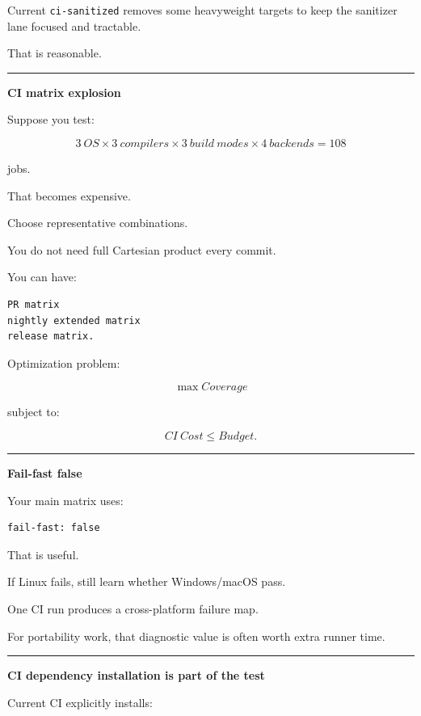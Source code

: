 Current \texttt{ci-sanitized} removes some heavyweight targets to keep the sanitizer lane focused and tractable.

That is reasonable.

\begin{center}\rule{0.5\linewidth}{0.5pt}\end{center}

\textbf{CI matrix explosion}

Suppose you test:

\[
3\ OS
\times
3\ compilers
\times
3\ build\ modes
\times
4\ backends
=
108
\]

jobs.

That becomes expensive.

Choose representative combinations.

You do not need full Cartesian product every commit.

You can have:

\begin{verbatim}
PR matrix
nightly extended matrix
release matrix.
\end{verbatim}

Optimization problem:

\[
\max Coverage
\]

subject to:

\[
CI\ Cost\le Budget.
\]

\begin{center}\rule{0.5\linewidth}{0.5pt}\end{center}

\textbf{Fail-fast false}

Your main matrix uses:

\begin{verbatim}
fail-fast: false
\end{verbatim}

That is useful.

If Linux fails, still learn whether Windows/macOS pass.

One CI run produces a cross-platform failure map.

For portability work, that diagnostic value is often worth extra runner time.

\begin{center}\rule{0.5\linewidth}{0.5pt}\end{center}

\textbf{CI dependency installation is part of the test}

Current CI explicitly installs:

